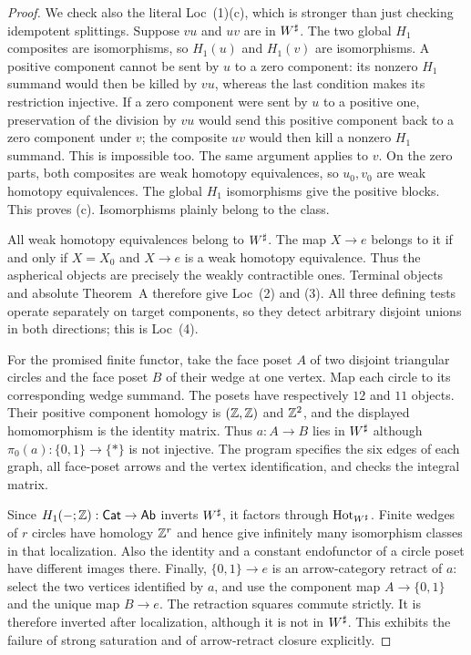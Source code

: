 \begin{proof}
We check also the literal Loc~(1)(c), which is stronger than just
checking idempotent splittings.  Suppose $vu$ and $uv$ are in
$W^{\sharp}$.  The two global $H_1$ composites are isomorphisms, so
$H_1(u)$ and $H_1(v)$ are isomorphisms.  A positive component cannot
be sent by $u$ to a zero component: its nonzero $H_1$ summand would
then be killed by $vu$, whereas the last condition makes its
restriction injective.  If a zero component were sent by $u$ to a
positive one, preservation of the division by $vu$ would send this
positive component back to a zero component under $v$; the composite
$uv$ would then kill a nonzero $H_1$ summand.  This is impossible too.
The same argument applies to $v$.  On the zero parts, both composites
are weak homotopy equivalences, so $u_0,v_0$ are weak homotopy
equivalences.  The global $H_1$ isomorphisms give the positive blocks.
This proves (c).  Isomorphisms plainly belong to the class.

All weak homotopy equivalences belong to $W^{\sharp}$.  The map $X\to e$
belongs to it if and only if $X=X_0$ and $X\to e$ is a weak homotopy
equivalence.  Thus the aspherical objects are precisely the weakly
contractible ones.  Terminal objects and absolute Theorem~A therefore
give Loc~(2) and (3).  All three defining tests operate separately on
target components, so they detect arbitrary disjoint unions in both
directions; this is Loc~(4).

For the promised finite functor, take the face poset $A$ of two
disjoint triangular circles and the face poset $B$ of their wedge at
one vertex.  Map each circle to its corresponding wedge summand.
The posets have respectively $12$ and $11$ objects.  Their positive
component homology is $(\mathbb Z,\mathbb Z)$ and $\mathbb Z^2$, and the displayed
homomorphism is the identity matrix.  Thus $a:A\to B$ lies in
$W^{\sharp}$ although $\pi_0(a):\{0,1\}\to\{*\}$ is not injective.
The program specifies the six edges of each graph, all face-poset
arrows and the vertex identification, and checks the integral matrix.

Since $H_1(-;\mathbb Z):\mathsf{Cat}\to\mathsf{Ab}$ inverts $W^{\sharp}$, it factors through
$\operatorname{Hot}_{W^{\sharp}}$.  Finite wedges of $r$ circles have homology $\mathbb Z^r$
and hence give infinitely many isomorphism classes in that localization.
Also the identity and a constant endofunctor of a circle poset have
different images there.  Finally, $\{0,1\}\to e$ is an arrow-category
retract of $a$: select the two vertices identified by $a$, and use the
component map $A\to\{0,1\}$ and the unique map $B\to e$.  The
retraction squares commute strictly.  It is therefore inverted after
localization, although it is not in $W^{\sharp}$.  This exhibits the
failure of strong saturation and of arrow-retract closure explicitly.
\end{proof}

